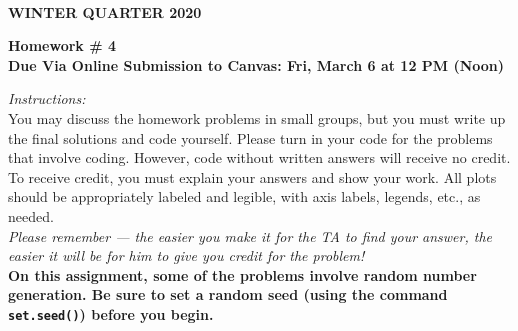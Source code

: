 \documentclass[12pt]{article}
\begin{document}
\\
{\bf WINTER QUARTER 2020}\\


\vspace{5mm}

\begin{center}
{\bf Homework \# 4}\\
{\bf Due Via Online Submission to Canvas: Fri, March 6 at 12 PM (Noon) }
\end{center}
\vspace{10mm}

\noindent \emph{Instructions:}\\

 You may discuss the homework problems in small groups, but you must write up the final solutions and code yourself. 
Please turn in your code for the problems that involve coding.  However, code without written answers will receive no credit. To receive credit, you must explain your answers and show your work. All plots should be appropriately labeled and legible, with axis labels, legends, etc., as needed. \\

\emph{Please remember --- the easier you make it for the TA to find your answer, the easier it will be for him to give you credit for the problem!} \\

{\bf  On this assignment, some of the problems involve random number generation. Be sure to set a random seed (using the command \verb=set.seed()=) before you begin.}

\vspace{10mm}
\end{document}
